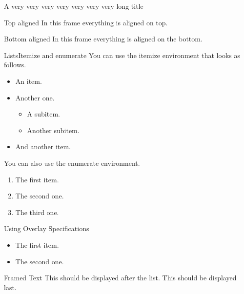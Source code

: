 %
%
%
%
%
\begin{frame}{A very very very very very very very long title}

\end{frame}
%
%
%
%
%
\begin{frame}[t]{Top aligned}
	In this frame everything is aligned on top.
\end{frame}
%
%
%
%
%
\begin{frame}[b]{Bottom aligned}
	In this frame everything is aligned on the bottom.
\end{frame}
%
%
%
%
%
\begin{frame}{Lists}{Itemize and enumerate}
	You can use the itemize environment that looks as follows.
	\begin{itemize}
		\item An item.
		\item Another one.
		      \begin{itemize}
			      \item A subitem.
			      \item Another subitem.
		      \end{itemize}
		\item And another item.
	\end{itemize}
	\vfill%
	You can also use the enumerate environment.
	\begin{enumerate}
		\item The first item.
		\item The second one.
		\item The third one.
	\end{enumerate}
\end{frame}

\begin{frame}{Using Overlay Specifications}
	\begin{itemize}[<+(1)->]
		\item The first item.
		\item The second one.
	\end{itemize}
	\pause
	\begin{block}{Framed Text}
		This should be displayed after the list.
		\pause
		This should be displayed last.
	\end{block}
\end{frame}
%
%
%
%
%

